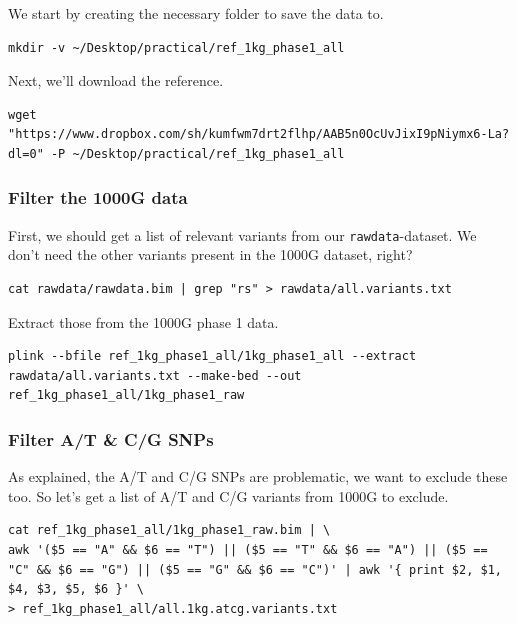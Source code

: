 \documentclass[
]{book}
\begin{document}
We start by creating the necessary folder to save the data to.

\begin{verbatim}
mkdir -v ~/Desktop/practical/ref_1kg_phase1_all
\end{verbatim}

Next, we'll download the reference.

\begin{verbatim}
wget "https://www.dropbox.com/sh/kumfwm7drt2flhp/AAB5n0OcUvJixI9pNiymx6-La?dl=0" -P ~/Desktop/practical/ref_1kg_phase1_all
\end{verbatim}

\hypertarget{filter-the-1000g-data}{%
\subsubsection{Filter the 1000G data}\label{filter-the-1000g-data}}

First, we should get a list of relevant variants from our \texttt{rawdata}-dataset. We don't need the other variants present in the 1000G dataset, right?

\begin{verbatim}
cat rawdata/rawdata.bim | grep "rs" > rawdata/all.variants.txt
\end{verbatim}

Extract those from the 1000G phase 1 data.

\begin{verbatim}
plink --bfile ref_1kg_phase1_all/1kg_phase1_all --extract rawdata/all.variants.txt --make-bed --out ref_1kg_phase1_all/1kg_phase1_raw
\end{verbatim}

\hypertarget{filter-at-cg-snps}{%
\subsubsection{Filter A/T \& C/G SNPs}\label{filter-at-cg-snps}}

As explained, the A/T and C/G SNPs are problematic, we want to exclude these too. So let's get a list of A/T and C/G variants from 1000G to exclude.

\begin{verbatim}
cat ref_1kg_phase1_all/1kg_phase1_raw.bim | \
awk '($5 == "A" && $6 == "T") || ($5 == "T" && $6 == "A") || ($5 == "C" && $6 == "G") || ($5 == "G" && $6 == "C")' | awk '{ print $2, $1, $4, $3, $5, $6 }' \
> ref_1kg_phase1_all/all.1kg.atcg.variants.txt
\end{verbatim}
\end{document}

